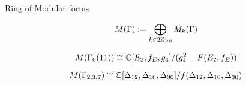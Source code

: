 \begin{frame}{Ring of Modular forms}






\begin{definition}
\[
M(\Gamma) := \bigoplus_{k \in 2\mathbb{Z}_{\geq 0}} M_k(\Gamma)
\]

\end{definition}




\begin{example}[LMFDB]
\[
M(\Gamma_0(11)) \cong \mathbb{C}[E_2,f_E,g_4]/(g_4^2 -F(E_2,f_E))
\]
\end{example}


\begin{example}[Ji, 1998]
\[
M(\Gamma_{2,3,7}) \cong \mathbb{C}[\Delta_{12},\Delta_{16},\Delta_{30}]/f(\Delta_{12},\Delta_{16},\Delta_{30})
\]
\end{example}






\end{frame}
